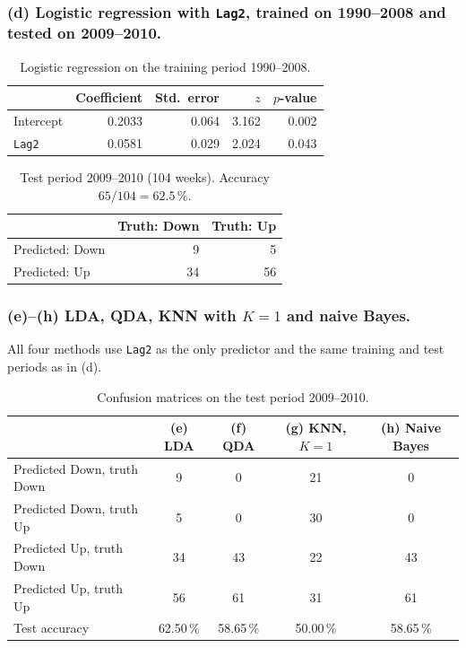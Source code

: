 \documentclass[11pt]{article}
\begin{document}
\subsubsection*{(d) Logistic regression with \texttt{Lag2}, trained on 1990--2008 and tested on 2009--2010.}

\begin{table}[H]
  \centering
  \begin{tabular}{lrrrr}
    \toprule
    & Coefficient & Std.\ error & $z$ & $p$-value \\
    \midrule
    Intercept & 0.2033 & 0.064 & 3.162 & 0.002 \\
    \texttt{Lag2} & 0.0581 & 0.029 & 2.024 & 0.043 \\
    \bottomrule
  \end{tabular}
  \caption{Logistic regression on the training period 1990--2008.}
\end{table}

\begin{table}[H]
  \centering
  \begin{tabular}{lrr}
    \toprule
    & Truth: Down & Truth: Up \\
    \midrule
    Predicted: Down & 9 & 5 \\
    Predicted: Up & 34 & 56 \\
    \bottomrule
  \end{tabular}
  \caption{Test period 2009--2010 (104 weeks). Accuracy $65/104 = 62.5\,\%$.}
\end{table}

\subsubsection*{(e)--(h) LDA, QDA, KNN with $K = 1$ and naive Bayes.}
All four methods use \texttt{Lag2} as the only predictor and the same training and test periods as in (d).

\begin{table}[H]
  \centering
  \begin{tabular}{lcccc}
    \toprule
    & (e) LDA & (f) QDA & (g) KNN, $K=1$ & (h) Naive Bayes \\
    \midrule
    Predicted Down, truth Down & 9 & 0 & 21 & 0 \\
    Predicted Down, truth Up & 5 & 0 & 30 & 0 \\
    Predicted Up, truth Down & 34 & 43 & 22 & 43 \\
    Predicted Up, truth Up & 56 & 61 & 31 & 61 \\
    \midrule
    Test accuracy & 62.50\,\% & 58.65\,\% & 50.00\,\% & 58.65\,\% \\
    \bottomrule
  \end{tabular}
  \caption{Confusion matrices on the test period 2009--2010.}
\end{table}
\end{document}
